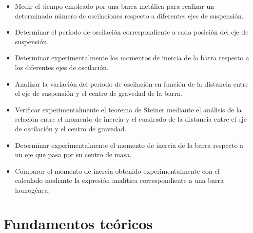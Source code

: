 \documentclass[11pt,a4paper]{article}
\begin{document}
\begin{itemize}

    \item Medir el tiempo empleado por una barra metálica para realizar
    un determinado número de oscilaciones respecto a diferentes ejes de
    suspensión.

    \item Determinar el período de oscilación correspondiente a cada
    posición del eje de suspensión.

    \item Determinar experimentalmente los momentos de inercia de la barra
    respecto a los diferentes ejes de oscilación.

    \item Analizar la variación del período de oscilación en función de la
    distancia entre el eje de suspensión y el centro de gravedad de la
    barra.

    \item Verificar experimentalmente el teorema de Steiner mediante el
    análisis de la relación entre el momento de inercia y el cuadrado de
    la distancia entre el eje de oscilación y el centro de gravedad.

    \item Determinar experimentalmente el momento de inercia de la barra
    respecto a un eje que pasa por su centro de masa.

    \item Comparar el momento de inercia obtenido experimentalmente con
    el calculado mediante la expresión analítica correspondiente a una
    barra homogénea.

\end{itemize}

\newpage
\section{Fundamentos teóricos}
\end{document}
